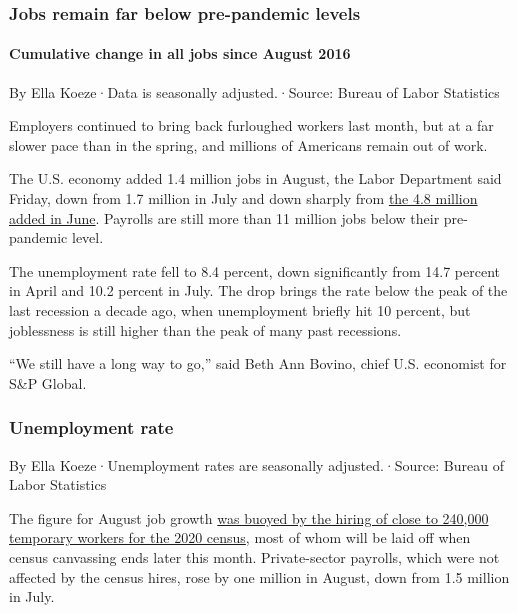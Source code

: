 \hypertarget{jobs-remain-far-below-pre-pandemic-levels}{%
\subsubsection{Jobs remain far below pre-pandemic
levels}\label{jobs-remain-far-below-pre-pandemic-levels}}

\hypertarget{cumulative-change-in-all-jobs-since-august-2016}{%
\paragraph{Cumulative change in all jobs since August
2016}\label{cumulative-change-in-all-jobs-since-august-2016}}

By Ella Koeze·Data is seasonally adjusted.·Source: Bureau of Labor
Statistics

Employers continued to bring back furloughed workers last month, but at
a far slower pace than in the spring, and millions of Americans remain
out of work.

The U.S. economy added 1.4 million jobs in August, the Labor Department
said Friday, down from 1.7 million in July and down sharply from
\href{https://www.nytimes3xbfgragh.onion/2020/07/02/business/economy/jobs-unemployment-coronavirus.html}{the
4.8 million added in June}. Payrolls are still more than 11 million jobs
below their pre-pandemic level.

The unemployment rate fell to 8.4 percent, down significantly from 14.7
percent in April and 10.2 percent in July. The drop brings the rate
below the peak of the last recession a decade ago, when unemployment
briefly hit 10 percent, but joblessness is still higher than the peak of
many past recessions.

``We still have a long way to go,'' said Beth Ann Bovino, chief U.S.
economist for S\&P Global.

\hypertarget{unemployment-rate}{%
\subsubsection{Unemployment rate}\label{unemployment-rate}}

By Ella Koeze·Unemployment rates are seasonally adjusted.·Source: Bureau
of Labor Statistics

The figure for August job growth
\href{https://www.nytimes3xbfgragh.onion/live/2020/09/04/business/stock-market-today-coronavirus/census-hiring-helped-increase-the-august-jobs-tally}{was
buoyed by the hiring of close to 240,000 temporary workers for the 2020
census}, most of whom will be laid off when census canvassing ends later
this month. Private-sector payrolls, which were not affected by the
census hires, rose by one million in August, down from 1.5 million in
July.

